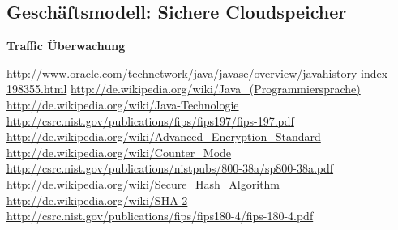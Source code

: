 \documentclass[12pt,a4paper,bibliography=totocnumbered,listof=totocnumbered]{scrartcl}
\begin{document}
\subsection{Geschäftsmodell: Sichere Cloudspeicher}
\textbf{Traffic Überwachung}\\
\pagebreak

\begin{thebibliography}{xxxxxxxxxxxxxxxxxxx}
	\url{http://www.oracle.com/technetwork/java/javase/overview/javahistory-index-198355.html}
	\url{http://de.wikipedia.org/wiki/Java_(Programmiersprache)}
	\url{ http://de.wikipedia.org/wiki/Java-Technologie}
	\url{http://csrc.nist.gov/publications/fips/fips197/fips-197.pdf}
	\url{http://de.wikipedia.org/wiki/Advanced_Encryption_Standard}
	\url{http://de.wikipedia.org/wiki/Counter_Mode}
	\url{http://csrc.nist.gov/publications/nistpubs/800-38a/sp800-38a.pdf}
	\url{http://de.wikipedia.org/wiki/Secure_Hash_Algorithm}
	\url{http://de.wikipedia.org/wiki/SHA-2}
	\url{http://csrc.nist.gov/publications/fips/fips180-4/fips-180-4.pdf}

	
	
	
	
\end{thebibliography}

\pagebreak

\setcounter{page}{1}
\end{document}

